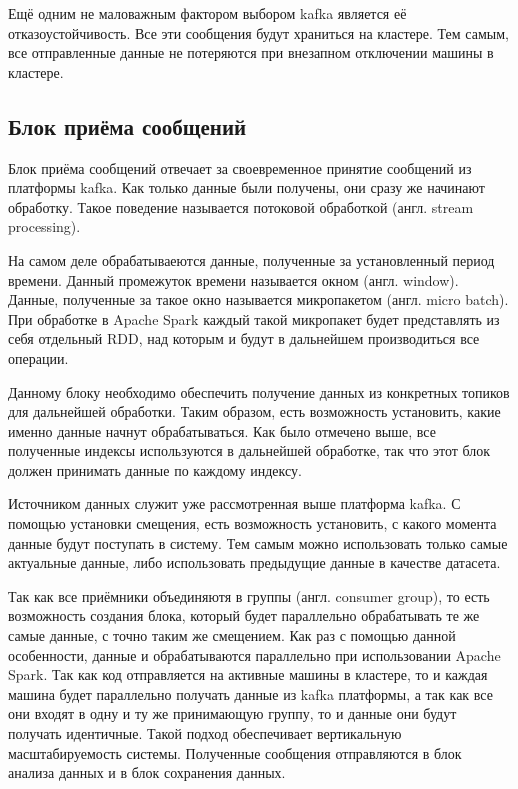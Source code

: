 Ещё одним не маловажным фактором выбором kafka является её отказоустойчивость.
Все эти сообщения будут храниться на кластере.
Тем самым, все отправленные данные не потеряются при внезапном отключении машины в кластере.


\subsection{Блок приёма сообщений}

Блок приёма сообщений отвечает за своевременное принятие сообщений из платформы kafka.
Как только данные были получены, они сразу же начинают обработку.
Такое поведение называется потоковой обработкой (англ. stream processing).

На самом деле обрабатываеются данные, полученные за установленный период времени.
Данный промежуток времени называется окном (англ. window).
Данные, полученные за такое окно называется микропакетом (англ. micro batch).
При обработке в Apache Spark каждый такой микропакет будет представлять из себя отдельный RDD, над которым и будут в дальнейшем производиться все операции.

Данному блоку необходимо обеспечить получение данных из конкретных топиков для дальнейшей обработки.
Таким образом, есть возможность установить, какие именно данные начнут обрабатываться.
Как было отмечено выше, все полученные индексы используются в дальнейшей обработке, так что этот блок должен принимать данные по каждому индексу.

Источником данных служит уже рассмотренная выше платформа kafka.
С помощью установки смещения, есть возможность установить, с какого момента данные будут поступать в систему.
Тем самым можно использовать только самые актуальные данные, либо использовать предыдущие данные в качестве датасета.

Так как все приёмники объединяютя в группы (англ. consumer group), то есть возможность создания блока, который будет параллельно обрабатывать те же самые данные, с точно таким же смещением.
Как раз с помощью данной особенности, данные и обрабатываются параллельно при использовании Apache Spark.
Так как код отправляется на активные машины в кластере, то и каждая машина будет параллельно получать данные из kafka платформы, а так как все они входят в одну и ту же принимающую группу, то и данные они будут получать идентичные.
Такой подход обеспечивает вертикальную масштабируемость системы.
Полученные сообщения отправляются в блок анализа данных и в блок сохранения данных.

